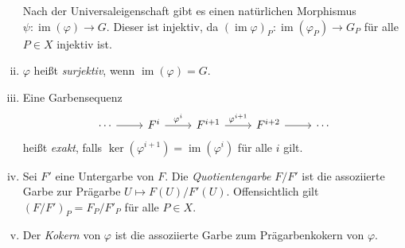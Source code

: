 \documentclass[11pt,b5paper,openany]{memoir}
\begin{document}
\begin{enumerate}[(i)]
Nach der Universaleigenschaft gibt es einen natürlichen Morphismus $\psi:\operatorname{im}(\varphi)\to G$. Dieser ist injektiv, da $(\operatorname{im}\varphi)_P:\operatorname{im}(\varphi_P) \to G_P$ für alle $P\in X$ injektiv ist.
\item $\varphi$ heißt \textit{surjektiv}, wenn $\operatorname{im}(\varphi)=G$.
\item Eine Garbensequenz
\[\begin{tikzcd}
\cdots \ar[r] & F^i\ar[r, "\varphi^i"] & F^{i+1}\ar[r, "\varphi^{i+1}"] & F^{i+2}\ar[r] & \cdots 
\end{tikzcd} \]
heißt \textit{exakt}, falls $\ker(\varphi^{i+1})=\operatorname{im}(\varphi^i)$ für alle $i$ gilt.
\item Sei $F'$ eine Untergarbe von $F$. Die \textit{Quotientengarbe} $F/F'$ ist die assoziierte Garbe zur Prägarbe $U\mapsto F(U)/F'(U)$. Offensichtlich gilt $(F/F')_P=F_P/F'_P$ für alle $P\in X$.
\item Der \textit{Kokern} von $\varphi$ ist die assoziierte Garbe zum Prägarbenkokern von $\varphi$.
\end{enumerate}
\end{document}
